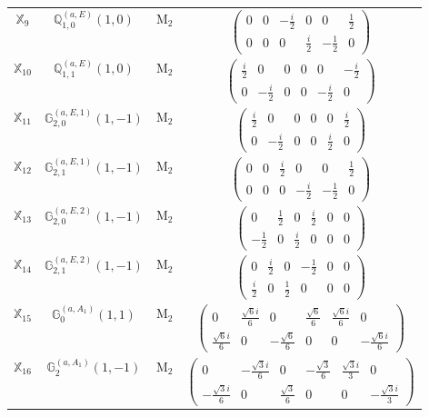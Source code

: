 \documentclass[fleqn,10pt,landscape]{article}
\begin{document}
\begin{itemize}
\begin{center}
\begin{longtable}{c|c|c|c}
$ \mathbb{X}_{9} $ & $\mathbb{Q}_{1,0}^{(a,E)}(1,0)$ & M$_{2}$ & $\begin{pmatrix} 0 & 0 & - \frac{i}{2} & 0 & 0 & \frac{1}{2} \\ 0 & 0 & 0 & \frac{i}{2} & - \frac{1}{2} & 0 \end{pmatrix}$ \\
$ \mathbb{X}_{10} $ & $\mathbb{Q}_{1,1}^{(a,E)}(1,0)$ & M$_{2}$ & $\begin{pmatrix} \frac{i}{2} & 0 & 0 & 0 & 0 & - \frac{i}{2} \\ 0 & - \frac{i}{2} & 0 & 0 & - \frac{i}{2} & 0 \end{pmatrix}$ \\
$ \mathbb{X}_{11} $ & $\mathbb{G}_{2,0}^{(a,E,1)}(1,-1)$ & M$_{2}$ & $\begin{pmatrix} \frac{i}{2} & 0 & 0 & 0 & 0 & \frac{i}{2} \\ 0 & - \frac{i}{2} & 0 & 0 & \frac{i}{2} & 0 \end{pmatrix}$ \\
$ \mathbb{X}_{12} $ & $\mathbb{G}_{2,1}^{(a,E,1)}(1,-1)$ & M$_{2}$ & $\begin{pmatrix} 0 & 0 & \frac{i}{2} & 0 & 0 & \frac{1}{2} \\ 0 & 0 & 0 & - \frac{i}{2} & - \frac{1}{2} & 0 \end{pmatrix}$ \\
$ \mathbb{X}_{13} $ & $\mathbb{G}_{2,0}^{(a,E,2)}(1,-1)$ & M$_{2}$ & $\begin{pmatrix} 0 & \frac{1}{2} & 0 & \frac{i}{2} & 0 & 0 \\ - \frac{1}{2} & 0 & \frac{i}{2} & 0 & 0 & 0 \end{pmatrix}$ \\
$ \mathbb{X}_{14} $ & $\mathbb{G}_{2,1}^{(a,E,2)}(1,-1)$ & M$_{2}$ & $\begin{pmatrix} 0 & \frac{i}{2} & 0 & - \frac{1}{2} & 0 & 0 \\ \frac{i}{2} & 0 & \frac{1}{2} & 0 & 0 & 0 \end{pmatrix}$ \\
$ \mathbb{X}_{15} $ & $\mathbb{G}_{0}^{(a,A_{1})}(1,1)$ & M$_{2}$ & $\begin{pmatrix} 0 & \frac{\sqrt{6} i}{6} & 0 & \frac{\sqrt{6}}{6} & \frac{\sqrt{6} i}{6} & 0 \\ \frac{\sqrt{6} i}{6} & 0 & - \frac{\sqrt{6}}{6} & 0 & 0 & - \frac{\sqrt{6} i}{6} \end{pmatrix}$ \\
$ \mathbb{X}_{16} $ & $\mathbb{G}_{2}^{(a,A_{1})}(1,-1)$ & M$_{2}$ & $\begin{pmatrix} 0 & - \frac{\sqrt{3} i}{6} & 0 & - \frac{\sqrt{3}}{6} & \frac{\sqrt{3} i}{3} & 0 \\ - \frac{\sqrt{3} i}{6} & 0 & \frac{\sqrt{3}}{6} & 0 & 0 & - \frac{\sqrt{3} i}{3} \end{pmatrix}$ \\ \hline

\end{longtable}
\end{center}
\end{itemize}
\end{document}
